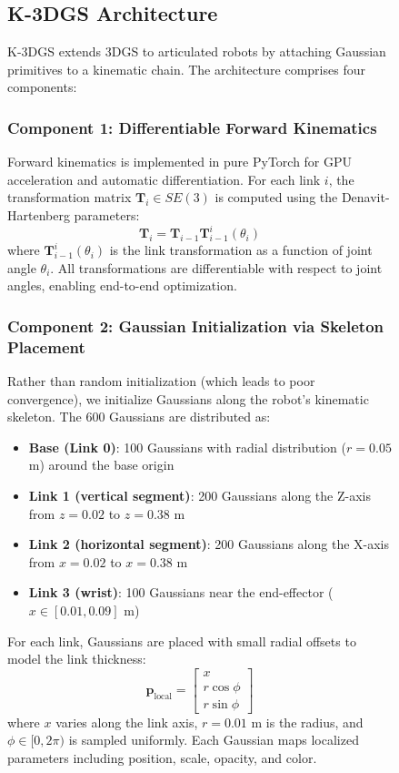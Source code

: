 \documentclass[12pt,a4paper,oneside]{report}
\begin{document}
\begin{figure}[H]
\subsection{K-3DGS Architecture}

K-3DGS extends 3DGS to articulated robots by attaching Gaussian primitives to a kinematic chain. The architecture comprises four components:

\subsubsection{Component 1: Differentiable Forward Kinematics}

Forward kinematics is implemented in pure PyTorch for GPU acceleration and automatic differentiation. For each link $i$, the transformation matrix $\mathbf{T}_i \in SE(3)$ is computed using the Denavit-Hartenberg parameters:
\begin{equation}
\mathbf{T}_i = \mathbf{T}_{i-1} \mathbf{T}_{i-1}^{i}(\theta_i)
\end{equation}
where $\mathbf{T}_{i-1}^{i}(\theta_i)$ is the link transformation as a function of joint angle $\theta_i$. All transformations are differentiable with respect to joint angles, enabling end-to-end optimization.

\subsubsection{Component 2: Gaussian Initialization via Skeleton Placement}

Rather than random initialization (which leads to poor convergence), we initialize Gaussians along the robot's kinematic skeleton. The 600 Gaussians are distributed as:
\begin{itemize}
    \item \textbf{Base (Link 0)}: 100 Gaussians with radial distribution ($r = 0.05$ m) around the base origin
    \item \textbf{Link 1 (vertical segment)}: 200 Gaussians along the Z-axis from $z=0.02$ to $z=0.38$ m
    \item \textbf{Link 2 (horizontal segment)}: 200 Gaussians along the X-axis from $x=0.02$ to $x=0.38$ m
    \item \textbf{Link 3 (wrist)}: 100 Gaussians near the end-effector ($x \in [0.01, 0.09]$ m)
\end{itemize}

For each link, Gaussians are placed with small radial offsets to model the link thickness:
\begin{equation}
\mathbf{p}_{\text{local}} = \begin{bmatrix} x \\ r \cos\phi \\ r \sin\phi \end{bmatrix}
\end{equation}
where $x$ varies along the link axis, $r = 0.01$ m is the radius, and $\phi \in [0, 2\pi)$ is sampled uniformly. Each Gaussian maps localized parameters including position, scale, opacity, and color.


\end{figure}
\end{document}
